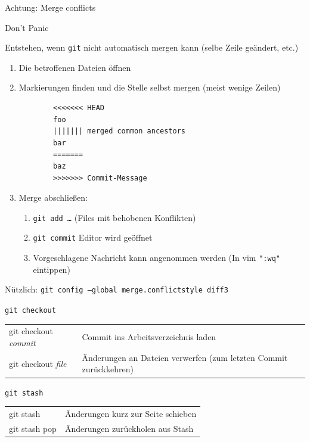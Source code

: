 \begin{frame}[fragile]{Achtung: Merge conflicts}
  \begin{center}
    \huge Don't Panic
  \end{center}

  Entstehen, wenn \texttt{git} nicht automatisch mergen kann (selbe Zeile geändert, etc.)

  \begin{enumerate}
    \item Die betroffenen Dateien öffnen
    \item Markierungen finden und die Stelle selbst mergen (meist wenige Zeilen)
      \begin{verbatim}
        <<<<<<< HEAD
        foo
        ||||||| merged common ancestors
        bar
        =======
        baz
        >>>>>>> Commit-Message
\end{verbatim}
    \item Merge abschließen:
      \begin{enumerate}
          \item \texttt{git add …} \quad (Files mit behobenen Konflikten)
        \item \texttt{git commit} \quad\rightarrow\; Editor wird geöffnet
        \item Vorgeschlagene Nachricht kann angenommen werden (In vim \texttt{":wq"} eintippen)
      \end{enumerate}
  \end{enumerate}
  Nützlich: \texttt{git config --global merge.conflictstyle diff3}
\end{frame}

\begin{frame}{\texttt{git checkout}}
  \begin{tabu}{>{\ttfamily}l X[,L]}
    git checkout \textit{commit} & Commit ins Arbeitsverzeichnis laden \\
    git checkout \textit{file}   & Änderungen an Dateien verwerfen (zum letzten Commit zurückkehren)
  \end{tabu}
\end{frame}

\begin{frame}{\texttt{git stash}}
  \begin{tabu}{>{\ttfamily}l X[,L]}
    git stash     & Änderungen kurz zur Seite schieben \\
    git stash pop & Änderungen zurückholen aus Stash
  \end{tabu}
\end{frame}

